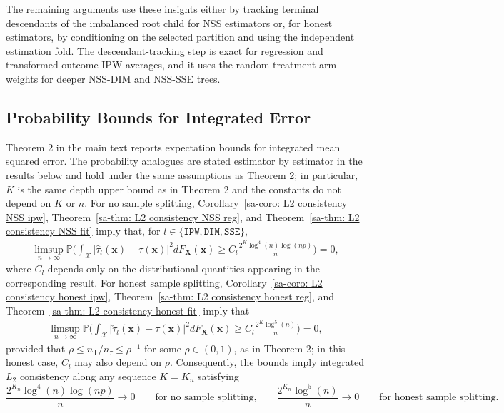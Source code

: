 \documentclass[10pt]{article}
\def\treeT{\mathsf{T}}
\def\bx{\mathbf{x}}
\def\bX{\mathbf{X}}
\def\P{\mathbb{P}}
\theoremstyle{definition}
\theoremstyle{remark}
\begin{document}
The remaining arguments use these insights either by tracking terminal descendants of the imbalanced root child for NSS estimators or, for honest estimators, by conditioning on the selected partition and using the independent estimation fold. The descendant-tracking step is exact for regression and transformed outcome IPW averages, and it uses the random treatment-arm weights for deeper NSS-DIM and NSS-SSE trees.


\subsection{Probability Bounds for Integrated Error}\label{sa-sec:high-probability-L2}

Theorem 2 in the main text reports expectation bounds for integrated mean squared error. The probability analogues are stated estimator by estimator in the results below and hold under the same assumptions as Theorem 2; in particular, $K$ is the same depth upper bound as in Theorem 2 and the constants do not depend on $K$ or $n$. For no sample splitting, Corollary~\ref{sa-coro: L2 consistency NSS ipw}, Theorem~\ref{sa-thm: L2 consistency NSS reg}, and Theorem~\ref{sa-thm: L2 consistency NSS fit} imply that, for $l\in\{\mathtt{IPW},\mathtt{DIM},\mathtt{SSE}\}$,
\begin{align*}
   \limsup_{n\to \infty} \P\Bigg(
   \int_\mathcal{X} \big| \hat\tau_{l}(\bx) - \tau(\bx) \big|^2 dF_{\bX}(\bx)
   \geq C_l\frac{2^K \log^4(n) \log(np)}{n}
   \Bigg) =0,
\end{align*}
where $C_l$ depends only on the distributional quantities appearing in the corresponding result. For honest sample splitting, Corollary~\ref{sa-coro: L2 consistency honest ipw}, Theorem~\ref{sa-thm: L2 consistency honest reg}, and Theorem~\ref{sa-thm: L2 consistency honest fit} imply that
\begin{align*}
   \limsup_{n\to \infty} \P\Bigg(
   \int_\mathcal{X} \big| \check\tau_{l}(\bx) - \tau(\bx) \big|^2 dF_{\bX}(\bx)
   \geq C_l\frac{2^K \log^5(n)}{n}
   \Bigg) =0,
\end{align*}
provided that $\rho \leq n_{\treeT}/n_{\tau}\leq \rho^{-1}$ for some $\rho\in(0,1)$, as in Theorem 2; in this honest case, $C_l$ may also depend on $\rho$.
Consequently, the bounds imply integrated $L_2$ consistency along any sequence $K=K_n$ satisfying
\[
    \frac{2^{K_n}\log^4(n)\log(np)}{n}\to0
    \qquad\text{for no sample splitting,}
    \qquad
    \frac{2^{K_n}\log^5(n)}{n}\to0
    \qquad\text{for honest sample splitting.}
\]
\end{document}
